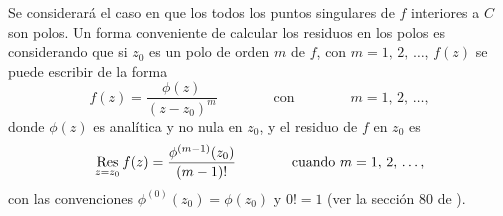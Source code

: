 \documentclass[a4paper]{report}
\def\Res{\qopname\relax m{Res}}
\begin{document}
Se considerará el caso en que los todos los puntos singulares de \(f\) interiores a \(C\) son polos. Un forma conveniente de calcular los residuos en los polos es considerando que si \(z_0\) es un polo de orden \(m\) de \(f\), con \(m=1,\,2,\,\dots\), \(f(z)\) se puede escribir de la forma 
 \[
  f(z)=\frac{\phi(z)}{(z-z_0)^m}
  \qquad\qquad\textrm{con}\qquad\qquad
  m=1,\,2,\,\dots,
 \]
donde \(\phi(z)\) es analítica y no nula en \(z_0\), y el residuo de \(f\) en \(z_0\) es
\begin{equation}\label{eq:z_transform_residues_at_poles_phi}
 \Res_{z=z_0}f(z)=\frac{\phi^{(m-1)}(z_0)}{(m-1)!}
 \qquad\qquad\textrm{cuando }m=1,\,2,\,\dots,
\end{equation}
con las convenciones \(\phi^{(0)}(z_0)=\phi(z_0)\) y \(0!=1\) (ver la sección 80 de \cite{brown2013complex}). 
\end{document}
